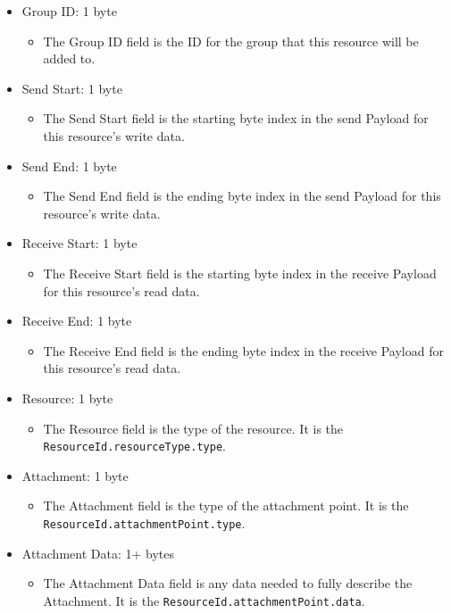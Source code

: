 \documentclass{article}
\begin{document}
\begin{itemize}
    \item Group ID: 1 byte
    \begin{itemize}
        \item The Group ID field is the ID for the \gls{group} that this \gls{resource} will be added to.
    \end{itemize}

    \item Send Start: 1 byte
    \begin{itemize}
        \item The Send Start field is the starting byte index in the send Payload for this
        \gls{resource}'s write data.
    \end{itemize}

    \item Send End: 1 byte
    \begin{itemize}
        \item The Send End field is the ending byte index in the send Payload for this \gls{resource}'s
        write data.
    \end{itemize}

    \item Receive Start: 1 byte
    \begin{itemize}
        \item The Receive Start field is the starting byte index in the receive Payload for this
        \gls{resource}'s read data.
    \end{itemize}

    \item Receive End: 1 byte
    \begin{itemize}
        \item The Receive End field is the ending byte index in the receive Payload for this
        \gls{resource}'s read data.
    \end{itemize}

    \item Resource: 1 byte
    \begin{itemize}
        \item The Resource field is the type of the \gls{resource}. It is the \\
        \texttt{ResourceId.resourceType.type}.
    \end{itemize}

    \item Attachment: 1 byte
    \begin{itemize}
        \item The Attachment field is the type of the attachment point. It is the
        \texttt{ResourceId.attachmentPoint.type}.
    \end{itemize}

    \item Attachment Data: 1+ bytes
    \begin{itemize}
        \item The Attachment Data field is any data needed to fully describe the Attachment. It is
        the \texttt{ResourceId.attachmentPoint.data}.
    \end{itemize}
\end{itemize}
\end{document}
